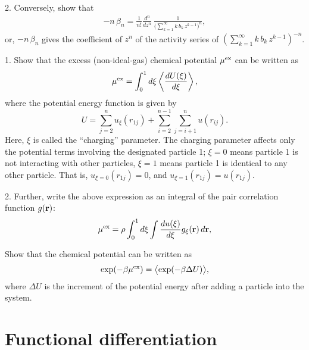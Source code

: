 \documentclass{book}
\begin{document}
2. Conversely, show that
\begin{align}
  -n \, \beta_n
=
  \frac{1} {n!}
  \frac{ d^{n} } { d z^{n} }
  \,
  \frac{1}
  {
  \bigl(
    \sum_{k = 1}^\infty k \, b_k \, z^{k-1}
  \bigr)^n
  },
\end{align}
or,
$-n \, \beta_n$
gives the coefficient of $z^n$
of the activity series of
$\left( \sum_{k = 1}^\infty k \, b_k \, z^{k-1} \right)^{-n}$.







1. Show that the excess (non-ideal-gas) chemical potential ${ { \mu }^{ \mathrm{ex} } }$ can be written as
\begin{equation}
  { { \mu }^{ \mathrm{ex} } }
=
  \int_0^1 d\xi \left\langle \frac{d U(\xi)}{d\xi} \right\rangle,
  \label{eq:muti}
\end{equation}
%
where the potential energy function is given by
\[
  U =
  \sum_{j = 2}^n u_\xi(r_{1j})
  +
  \sum_{i = 2}^{n - 1} \sum_{j = i+1}^n u(r_{ij}).
\]
%
Here, $\xi$ is called the ``charging'' parameter.
%
The charging parameter affects only the potential terms involving
the designated particle 1;
$\xi = 0$ means particle 1 is not interacting with other particles,
$\xi = 1$ means particle 1 is identical to any other particle.
%
That is,
$u_{\xi = 0}(r_{1j}) = 0$,
and
$u_{\xi = 1}(r_{1j}) = u(r_{1j})$.

2. Further, write the above expression as an integral of
the pair correlation function $g(\boldsymbol{\mathbf{r}})$:
\begin{equation}
  { { \mu }^{ \mathrm{ex} } }
=
  \rho \int_0^1 d\xi \int \frac{d u(\xi)}{d\xi} g_\xi(\boldsymbol{\mathbf{r}}) \, d\boldsymbol{\mathbf{r}},
  \label{eq:mutigr}
\end{equation}




Show that the chemical potential can be written as
\begin{equation}
  \exp(-\beta { { \mu }^{ \mathrm{ex} } })
=
  \bigl\langle
    \exp( -\beta \Delta U )
  \bigr\rangle,
\end{equation}
%
where $\Delta U$ is the increment of the potential energy
after adding a particle into the system.



\chapter{Functional differentiation}
\end{document}
